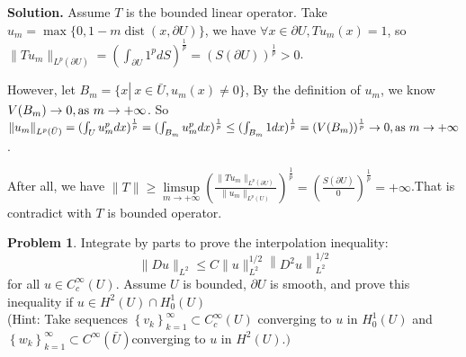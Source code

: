 \documentclass[a4paper]{book}
\newenvironment{solution}%
{\noindent\textbf{Solution.}}%
{\qedhere}
\numberwithin{equation}{chapter}
\theoremstyle{definition}
\newtheorem{problem}[exm]{Problem}
\begin{document}
\begin{solution}
  Assume $T$ is the bounded linear operator. Take $u_m = \max \{0, 1 - m  \operatorname{dist} (x ,\partial U)\}$, we have $\forall x \in \partial U, Tu_m(x) = 1$, so $\| Tu_m \|_{L^p(\partial U)} = (\int_{\partial U} 1^p dS)^{\frac{1}{p}} = (S(\partial U))^{\frac{1}{p}} > 0$.

  However, let $B_m = \{x \left.\right|\ x \in \bar{U}, u_m(x) \not= 0\}$, By the definition of $u_m$, we know $V(B_m) \rightarrow 0, \textmd{as } m \rightarrow +\infty$. So $\|u_m \|_{L^p(\bar{U})} = (\int_U u_m^p dx)^{\frac{1}{p}} = (\int_{B_m} u_m^p dx)^{\frac{1}{p}} \leq (\int_{B_m} 1 dx)^{\frac{1}{p}} = (V(B_m))^{\frac{1}{p}} \rightarrow 0 ,\textmd{as } m \rightarrow + \infty$.

  After all, we have $\| T \| \geq \limsup\limits_{m \rightarrow +\infty} (\frac{\| T u_m \|_{L^p(\partial U)}}{\|u_m\|_{L^p(U)}})^{\frac{1}{p}} = (\frac{ S(\partial U)}{ 0 })^{\frac{1}{p}} = +\infty$.That is contradict with $T$ is bounded operator.
\end{solution}

\begin{problem}
  Integrate by parts to prove the interpolation inequality:
  \[
    \|D u\|_{L^{2}} \leq C\|u\|_{L^{2}}^{1 / 2}\left\|D^{2} u\right\|_{L^{2}}^{1 / 2}
  \]
  for all $u \in C_{c}^{\infty}(U) .$ Assume $U$ is bounded, $\partial U$ is smooth, and prove this inequality if $u \in H^{2}(U) \cap H_{0}^{1}(U)$ \\
  (Hint: Take sequences $\left\{v_{k}\right\}_{k=1}^{\infty} \subset C_{c}^{\infty}(U)$ converging to $u$ in $H_{0}^{1}(U)$ and $\left\{w_{k}\right\}_{k=1}^{\infty} \subset C^{\infty}(\bar{U}) $converging to $u \text { in } H^{2}(U) .)$
\end{problem}
\end{document}
